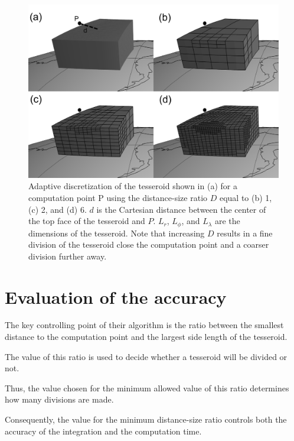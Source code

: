 \documentclass[paper,twocolumn]{geophysics}
\begin{document}
\begin{figure}
    \centering
    \includegraphics{figs/tesseroid-split}
    \caption{
        Adaptive discretization
        of the tesseroid shown in (a)
        for a computation point P
        using the distance-size ratio $D$ equal to
        (b) 1, (c) 2, and (d) 6.
        $d$ is the Cartesian distance between
        the center of the top face of the tesseroid
        and $P$.
        $L_r$, $L_\phi$, and $L_\lambda$ are the dimensions of the tesseroid.
        Note that increasing $D$
        results in a fine division of the tesseroid
        close the computation point
        and a coarser division further away.
    }
    \label{fig:ratio}
\end{figure}

\section{Evaluation of the accuracy}

The key controlling point of their algorithm is the ratio between
the smallest distance to the computation point and
the largest side length of the tesseroid.

The value of this ratio is used to decide whether a tesseroid will be divided
or not.

Thus, the value chosen for the minimum allowed value of this ratio determines
how many divisions are made.

Consequently, the value for the minimum distance-size ratio controls both the
accuracy of the integration and the computation time.
\end{document}
